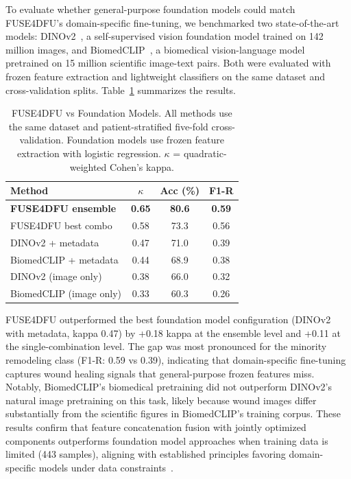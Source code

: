 \documentclass[journal,twoside,web]{ieeecolor}
\begin{document}
To evaluate whether general\nobreakdash-purpose foundation models could match FUSE4DFU's domain\nobreakdash-specific fine\nobreakdash-tuning, we benchmarked two state\nobreakdash-of\nobreakdash-the\nobreakdash-art models: DINOv2~\cite{oquab2024dinov2}, a self\nobreakdash-supervised vision foundation model trained on 142 million images, and BiomedCLIP~\cite{zhang2024biomedclip}, a biomedical vision\nobreakdash-language model pretrained on 15 million scientific image\nobreakdash-text pairs. Both were evaluated with frozen feature extraction and lightweight classifiers on the same dataset and cross\nobreakdash-validation splits. Table~\ref{tab:foundation_comparison} summarizes the results.

\begin{table}[!t]
\renewcommand{\arraystretch}{1.2}
\caption{FUSE4DFU vs Foundation Models. All methods use the same dataset and patient-stratified five-fold cross-validation. Foundation models use frozen feature extraction with logistic regression. $\kappa$ = quadratic-weighted Cohen's kappa.}
\label{tab:foundation_comparison}
\centering
\footnotesize
\begin{tabular}{|l|c|c|c|}
\hline
\textbf{Method} & \textbf{$\kappa$} & \textbf{Acc (\%)} & \textbf{F1-R} \\
\hline
\textbf{FUSE4DFU ensemble} & \textbf{0.65} & \textbf{80.6} & \textbf{0.59} \\
FUSE4DFU best combo & 0.58 & 73.3 & 0.56 \\
\hline
DINOv2 + metadata & 0.47 & 71.0 & 0.39 \\
BiomedCLIP + metadata & 0.44 & 68.9 & 0.38 \\
DINOv2 (image only) & 0.38 & 66.0 & 0.32 \\
BiomedCLIP (image only) & 0.33 & 60.3 & 0.26 \\
\hline
\end{tabular}
\end{table}

FUSE4DFU outperformed the best foundation model configuration (DINOv2 with metadata, kappa 0.47) by +0.18 kappa at the ensemble level and +0.11 at the single\nobreakdash-combination level. The gap was most pronounced for the minority remodeling class (F1\nobreakdash-R: 0.59 vs 0.39), indicating that domain\nobreakdash-specific fine\nobreakdash-tuning captures wound healing signals that general\nobreakdash-purpose frozen features miss. Notably, BiomedCLIP's biomedical pretraining did not outperform DINOv2's natural image pretraining on this task, likely because wound images differ substantially from the scientific figures in BiomedCLIP's training corpus. These results confirm that feature concatenation fusion with jointly optimized components outperforms foundation model approaches when training data is limited (443 samples), aligning with established principles favoring domain\nobreakdash-specific models under data constraints~\cite{kebaili2023deep}.
\end{document}
